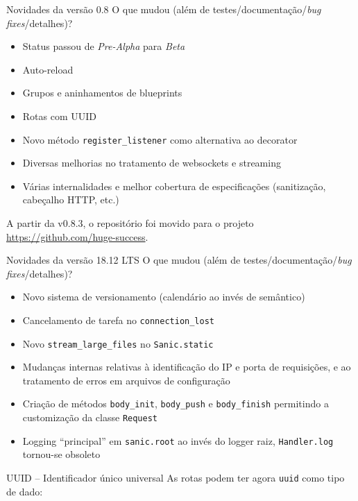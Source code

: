 \documentclass[utf8]{beamer}
\begin{document}
\begin{frame}{Novidades da versão 0.8}
  O que mudou
  (além de testes/documentação/\emph{bug fixes}/detalhes)?
  \begin{itemize}
    \item Status passou de \emph{Pre-Alpha} para \emph{Beta}
    \item Auto-reload
    \item Grupos e aninhamentos de blueprints
    \item Rotas com UUID
    \item Novo método \texttt{register\_listener}
          como alternativa ao decorator
    \item Diversas melhorias no tratamento de websockets e streaming
    \item Várias internalidades e melhor cobertura de especificações
          (sanitização, cabeçalho HTTP, etc.)
  \end{itemize}
  \vfill
  A partir da v0.8.3, o repositório foi movido para o projeto
  \url{https://github.com/huge-success}.
\end{frame}


\begin{frame}{Novidades da versão 18.12 LTS}
  O que mudou
  (além de testes/documentação/\emph{bug fixes}/detalhes)?
  \begin{itemize}
    \item Novo sistema de versionamento
          (calendário ao invés de semântico)
    \item Cancelamento de tarefa no \texttt{connection\_lost}
    \item Novo \texttt{stream\_large\_files} no \texttt{Sanic.static}
    \item Mudanças internas relativas
          à identificação do IP e porta de requisições,
          e ao tratamento de erros em arquivos de configuração
    \item Criação de métodos
            \texttt{body\_init},
            \texttt{body\_push} e
            \texttt{body\_finish}
          permitindo a customização da classe \texttt{Request}
    \item Logging ``principal'' em \texttt{sanic.root}
          ao invés do logger raiz,
          \texttt{Handler.log} tornou-se obsoleto
  \end{itemize}
\end{frame}


\begin{frame}[fragile]{UUID -- Identificador único universal}
  As rotas podem ter agora \texttt{uuid} como tipo de dado:
  \inputminted{python}{uuid_route.py}
\end{frame}
\end{document}
